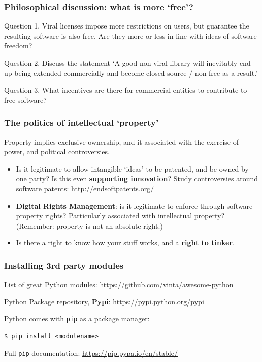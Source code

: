\documentclass{beamer} %
\newcommand\emc[1]{\textcolor{brightblue}{\textbf{#1}}}
\begin{document}
\begin{frame}

\frametitle{Philosophical discussion: what is more `free'?}

Question 1. Viral licenses impose more restrictions on users, but guarantee the resulting software is also free. Are they more or less in line with ideas of software freedom?

\vspace{5mm}

Question 2. Discuss the statement `A good non-viral library will inevitably end up being extended commercially and become closed source / non-free as a result.'

\vspace{5mm}

Question 3. What incentives are there for commercial entities to contribute to free software?

\vspace{5mm}


\end{frame}


\begin{frame}

\frametitle{The politics of intellectual `property'}

Property implies exclusive ownership, and it associated with the exercise of power, and political controversies.

\begin{itemize}
\item Is it legitimate to allow intangible `ideas' to be patented, and be owned by one party? Is this even \emc{supporting innovation}? Study controversies around software patents: \url{http://endsoftpatents.org/}
\item \emc{Digital Rights Management}: is it legitimate to enforce through software property rights? Particularly associated with intellectual property? (Remember: property is not an absolute right.)
\item Is there a right to know how your stuff works, and a \emc{right to tinker}.
\end{itemize}

\end{frame}


\begin{frame}[fragile]

\frametitle{Installing 3rd party modules}

List of great Python modules: \url{https://github.com/vinta/awesome-python}

Python Package repository, \emc{Pypi}: \url{https://pypi.python.org/pypi}

\vspace{3mm}
Python comes with \texttt{pip} as a package manager:
\begin{verbatim}
$ pip install <modulename>
\end{verbatim}
Full \texttt{pip} documentation: \url{https://pip.pypa.io/en/stable/}

\end{frame}
\end{document}
